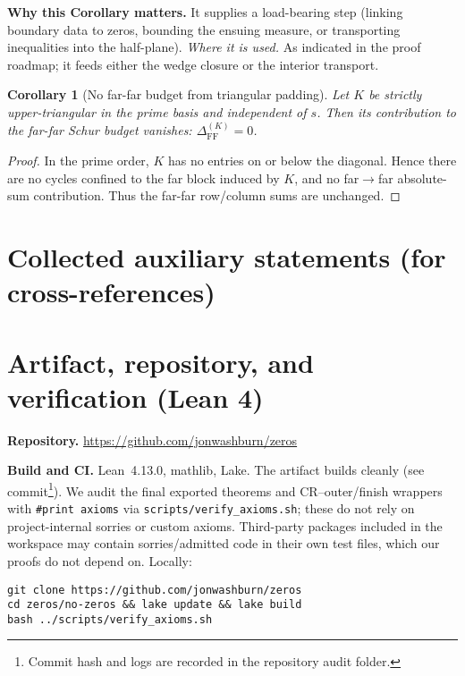 \documentclass[11pt]{article}
\newtheorem{corollary}{Corollary}[section]
\theoremstyle{definition}
\theoremstyle{remark}
\begin{document}
\vspace{1.0cm}
\noindent\textbf{Why this Corollary matters.} It supplies a load-bearing step (linking boundary data to zeros, bounding the ensuing measure, or transporting inequalities into the half-plane).
\noindent\textit{Where it is used.} As indicated in the proof roadmap; it feeds either the wedge closure or the interior transport.
\begin{corollary}[No far-far budget from triangular padding]\label{cor:K-no-FF}
Let $K$ be strictly upper-triangular in the prime basis and independent of $s$. Then its contribution to the far-far Schur budget vanishes: $\Delta_{\mathrm{FF}}^{(K)}=0$.
\end{corollary}
\begin{proof}
In the prime order, $K$ has no entries on or below the diagonal. Hence there are no cycles confined to the far block induced by $K$, and no far$\to$far absolute-sum contribution. Thus the far-far row/column sums are unchanged.
\end{proof}
% 
\section*{Collected auxiliary statements (for cross-references)}
\section*{Artifact, repository, and verification (Lean 4)}
\vspace{-0.3em}
\noindent\textbf{Repository.} \url{https://github.com/jonwashburn/zeros} \quad

\noindent\textbf{Build and CI.} Lean~4.13.0, mathlib, Lake. The artifact builds cleanly (see commit\footnote{Commit hash and logs are recorded in the repository audit folder.}). We audit the final exported theorems and CR–outer/finish wrappers with \texttt{\#print axioms} via \texttt{scripts/verify\_axioms.sh}; these do not rely on project-internal sorries or custom axioms. Third-party packages included in the workspace may contain sorries/admitted code in their own test files, which our proofs do not depend on. Locally:
\begin{verbatim}
git clone https://github.com/jonwashburn/zeros
cd zeros/no-zeros && lake update && lake build
bash ../scripts/verify_axioms.sh
\end{verbatim}
\end{document}
